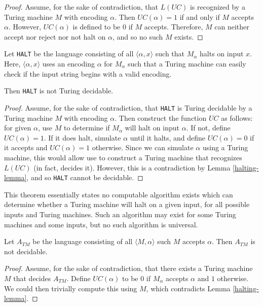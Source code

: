 \begin{proof}
    Assume, for the sake of contradiction, that $L(UC)$ is recognized by a Turing machine $M$ with encoding $\alpha$. Then $UC(\alpha) = 1$ if and only if $M$ accepts $\alpha$. However, $UC(\alpha)$ is defined to be $0$ if $M$ accepts. Therefore, $M$ can neither accept nor reject nor not halt on $\alpha$, and so no such $M$ exists.
\end{proof}

\begin{thm}\label{halting-problem}
    Let \verb|HALT| be the language consisting of all $\langle \alpha, x \rangle$ such that $M_{\alpha}$ halts on input $x$. Here, $\langle \alpha, x \rangle$ uses an encoding $\alpha$ for $M_{\alpha}$ such that a Turing machine can easily check if the input string begins with a valid encoding.

    Then \verb|HALT| is not Turing decidable.
\end{thm}

\begin{proof}
    Assume, for the sake of contradiction, that \verb|HALT| is Turing decidable by a Turing machine $M$ with encoding $\alpha$. Then construct the function $UC$ as follows: for given $\alpha$, use $M$ to determine if $M_{\alpha}$ will halt on input $\alpha$. If not, define $UC(\alpha) = 1$. If it does halt, simulate $\alpha$ until it halts, and define $UC(\alpha) = 0$ if it accepts and $UC(\alpha) = 1$ otherwise. Since we can simulate $\alpha$ using a Turing machine, this would allow use to construct a Turing machine that recognizes $L(UC)$ (in fact, decides it). However, this is a contradiction by Lemma \ref{halting-lemma}, and so \verb|HALT| cannot be decidable.
\end{proof}

\begin{rmk}
    This theorem essentially states no computable algorithm exists which can determine whether a Turing machine will halt on a given input, for all possible inputs and Turing machines. Such an algorithm may exist for some Turing machines and some inputs, but no such algorithm is universal.
\end{rmk}

\begin{prop}
    Let $A_{TM}$ be the language consisting of all $\langle M, \alpha \rangle$ such $M$ accepts $\alpha$. Then $A_{TM}$ is not decidable.
\end{prop}

\begin{proof}
    Assume, for the sake of contradiction, that there exists a Turing machine $M$ that decides $A_{TM}$. Define $UC(\alpha)$ to be $0$ if $M_{\alpha}$ accepts $\alpha$ and $1$ otherwise. We could then trivially compute this using $M$, which contradicts Lemma \ref{halting-lemma}.
\end{proof}

